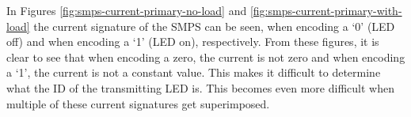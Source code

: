 In Figures \ref{fig:smps-current-primary-no-load} and \ref{fig:smps-current-primary-with-load} the current signature of the SMPS can be seen, when encoding a `0' (LED off) and when encoding a `1' (LED on), respectively.
From these figures, it is clear to see that when encoding a zero, the current is not zero and when encoding a `1', the current is not a constant value.
This makes it difficult to determine what the ID of the transmitting LED is.
This becomes even more difficult when multiple of these current signatures get superimposed.



